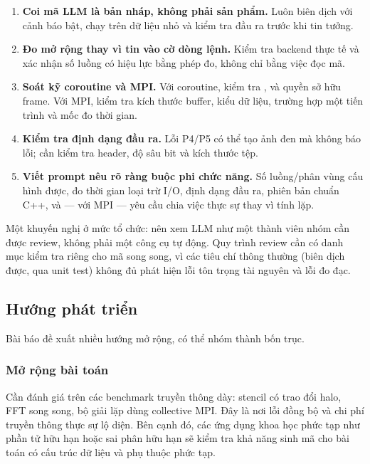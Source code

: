 \begin{enumerate}
  \item \textbf{Coi mã LLM là bản nháp, không phải sản phẩm.} Luôn biên dịch với
        cảnh báo bật, chạy trên dữ liệu nhỏ và kiểm tra đầu ra trước khi tin
        tưởng.
  \item \textbf{Đo mở rộng thay vì tin vào cờ dòng lệnh.} Kiểm tra backend thực
        tế và xác nhận số luồng có hiệu lực bằng phép đo, không chỉ bằng việc đọc
        mã.
  \item \textbf{Soát kỹ coroutine và MPI.} Với coroutine, kiểm tra
        ,  và quyền sở hữu frame. Với
        MPI, kiểm tra kích thước buffer, kiểu dữ liệu, trường hợp một tiến trình
        và mốc đo thời gian.
  \item \textbf{Kiểm tra định dạng đầu ra.} Lỗi P4/P5 có thể tạo ảnh đen mà không
        báo lỗi; cần kiểm tra header, độ sâu bit và kích thước tệp.
  \item \textbf{Viết prompt nêu rõ ràng buộc phi chức năng.} Số luồng/phân vùng
        cấu hình được, đo thời gian loại trừ I/O, định dạng đầu ra, phiên bản
        chuẩn C++, và — với MPI — yêu cầu chia việc thực sự thay vì tính lặp.
\end{enumerate}

Một khuyến nghị ở mức tổ chức: nên xem LLM như một thành viên nhóm cần được
review, không phải một công cụ tự động. Quy trình review cần có danh mục kiểm tra
riêng cho mã song song, vì các tiêu chí thông thường (biên dịch được, qua unit
test) không đủ phát hiện lỗi tôn trọng tài nguyên và lỗi đo đạc.

\subsection{Hướng phát triển}

Bài báo đề xuất nhiều hướng mở rộng, có thể nhóm thành bốn trục.

\subsubsection{Mở rộng bài toán}

Cần đánh giá trên các benchmark truyền thông dày: stencil có trao đổi halo, FFT
song song, bộ giải lặp dùng collective MPI. Đây là nơi lỗi đồng bộ và chi phí
truyền thông thực sự lộ diện. Bên cạnh đó, các ứng dụng khoa học phức tạp như
phần tử hữu hạn hoặc sai phân hữu hạn sẽ kiểm tra khả năng sinh mã cho bài toán
có cấu trúc dữ liệu và phụ thuộc phức tạp.

